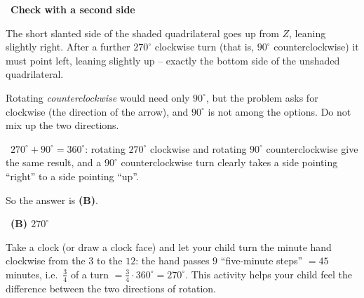 \documentclass[11pt]{article}
\providecommand{\AnsWord}{Đáp số}
\newcommand{\ans}[1]{\par\smallskip{\bfseries\color{tmGreen!88!black}\AnsWord:}\ {\bfseries\color{AnsRed}#1}\par}
\newcommand{\step}[2]{\par\smallskip\noindent{\bfseries\color{tmBlue!85!black}\StepWord~#1.}\ {\bfseries #2}\par\nopagebreak}
\newcommand{\verify}[1]{\par\smallskip\noindent{\bfseries\color{tmGreen!80!black}\faCheckCircle\ \CheckWord}\ #1\par}
\def\AnsWord{Answer}
\def\StepWord{Step}
\def\CheckWord{Check:}
\begin{document}
{\step{3}{Check with a second side}
The short slanted side of the shaded quadrilateral goes up from $Z$, leaning slightly right. After a further $270^\circ$ clockwise turn (that is, $90^\circ$ counterclockwise) it must point left, leaning slightly up -- exactly the bottom side of the unshaded quadrilateral.
\begin{warnbox}Rotating \emph{counterclockwise} would need only $90^\circ$, but the problem asks for clockwise (the direction of the arrow), and $90^\circ$ is not among the options. Do not mix up the two directions.\end{warnbox}
\verify{$270^\circ+90^\circ=360^\circ$: rotating $270^\circ$ clockwise and rotating $90^\circ$ counterclockwise give the same result, and a $90^\circ$ counterclockwise turn clearly takes a side pointing ``right'' to a side pointing ``up''.}
So the answer is \textbf{(B)}.
\ans{(B) $270^\circ$}
\begin{parentbox}Take a clock (or draw a clock face) and let your child turn the minute hand clockwise from the $3$ to the $12$: the hand passes $9$ ``five-minute steps'' $=45$ minutes, i.e.\ $\frac34$ of a turn $=\frac34\cdot360^\circ=270^\circ$. This activity helps your child feel the difference between the two directions of rotation.\end{parentbox}
}
\end{document}
